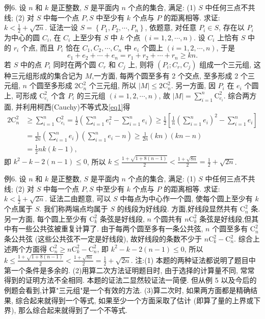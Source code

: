 例6. 设 $n$ 和 $k$ 是正整数, $S$ 是平面内 $n$ 个点的集合, 满足:
(1) $S$ 中任何三点不共线;
(2) 对 $S$ 中每一个点 $P, S$ 中至少有 $k$ 个点与 $P$ 的距离相等.
求证: $k<\frac{1}{2}+\sqrt{2 n}$. 
证法一设 $S=\left\{P_1, P_2, \cdots, P_n\right\}$, 依题意, 对任意 $P_i \in S$, 存在以 $P_i$ 为中心的圆 $C_i$, 在 $C_i$ 上至少有 $S$ 中 $k$ 个点 $(i=1,2, \cdots, n)$. 设 $C_i$ 上恰有 $S$ 中的 $r_i$ 个点, 而且 $P_i$ 恰在 $C_1, C_2, \cdots, C_n$ 中 $e_i$ 个圆上 $(i=1,2, \cdots, n)$, 于是
$$
e_1+e_2+\cdots+e_n=r_1+r_2+\cdots+r_n \geqslant k n . \label{eq1}
$$
若 $S$ 中的点 $P_i$ 同时在两个圆 $C_r$ 和 $C_j$ 上, 则将 $\left(P_i ; C_r, C_j\right)$ 组成一个三元组, 这种三元组形成的集合记为 $M$,一方面, 每两个圆至多有 2 个交点, 至多形成 2 个三元组, $n$ 个圆至多形成 $2 \mathrm{C}_n^2$ 个三元组, 所以 $|M| \leqslant 2 \mathrm{C}_n^2$. 另一方面, 因 $P_i$ 在 $e_i$ 个圆上, 可形成 $\mathrm{C}_{e_i}^2$ 个含 $P_i$ 的三元组 $(i=1,2, \cdots, n)$, 故 $|M|=\sum_{i=1}^n \mathrm{C}_{e_i}^2$.
综合两方面, 并利用柯西(Cauchy)不等式及\ref{eq1}得
$$
\begin{aligned}
2 \mathrm{C}_n^2 & \geqslant \sum_{i=1}^n \mathrm{C}_{e_i}^2=\frac{1}{2}\left(\sum_{i=1}^n e_i^2-\sum_{i=1}^n e_i\right) \geqslant \frac{1}{2}\left[\frac{1}{n}\left(\sum_{i=1}^n e_i\right)^2-\sum_{i=1}^n e_i\right] \\
& =\frac{1}{2 n}\left(\sum_{i=1}^n e_i\right)\left(\sum_{i=1}^n e_i-n\right) \geqslant \frac{1}{2 n}(k n)(k n-n) \\
& =\frac{1}{2} n k(k-1),
\end{aligned}
$$
即 $k^2-k-2(n-1) \leqslant 0$, 所以 $k \leqslant \frac{1+\sqrt{1+8(n-1)}}{2}<\frac{1+\sqrt{8 n}}{2}=\frac{1}{2}+ \sqrt{2 n}$.



例6. 设 $n$ 和 $k$ 是正整数, $S$ 是平面内 $n$ 个点的集合, 满足:
(1) $S$ 中任何三点不共线;
(2) 对 $S$ 中每一个点 $P, S$ 中至少有 $k$ 个点与 $P$ 的距离相等.
求证: $k<\frac{1}{2}+\sqrt{2 n}$. 
证法二由题意, 可以 $S$ 中每点为中心作一个圆, 使每个圆上至少有 $k$ 个点属于 $S$.
我们称两端点均属于 $S$ 的线段为好线段.
方面,好线段显然共有 $\mathrm{C}_n^2$ 条.
另一方面, 每个圆上至少有 $\mathrm{C}_k^2$ 条弦是好线段, $n$ 个圆共有 $n \mathrm{C}_k^2$ 条弦是好线段,但其中有一些公共弦被重复计算了.
由于每两个圆至多有一条公共弦, $n$ 个圆至多有 $\mathrm{C}_n^2$ 条公共弦 (这些公共弦不一定是好线段), 故好线段的条数不少于 $n \mathrm{C}_k^2-\mathrm{C}_n^2$.
综合上述两个方面得 $\mathrm{C}_n^2 \geqslant n \mathrm{C}_k^2-\mathrm{C}_n^2$, 即 $k^2-k-2(n-1) \leqslant 0$, 所以 $k \leqslant \frac{1+\sqrt{1+8(n-1)}}{2}<\frac{1+\sqrt{8 n}}{2}=\frac{1}{2}+\sqrt{2 n}$.
注:(1) 本题的两种证法都说明了题目中第一个条件是多余的.
(2)用算二次方法证明题目时, 由于选择的计算量不同, 常常得到的证明方法不全相同.
本题的证法二显然较证法一简便.
但从例 5 以及今后的例题会看到,计算"三元组"是一个有效的方法.
(3)算二次时, 如果两方面都是精确结果, 综合起来就得到一个等式, 如果至少一个方面采取了估计 (即算了量的上界或下界), 那么综合起来就得到了一个不等式.



